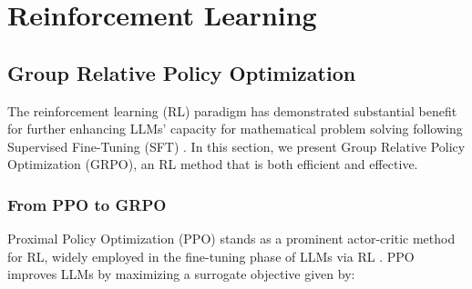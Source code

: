 \section{Reinforcement Learning}

\subsection{Group Relative Policy Optimization} The reinforcement learning (RL) paradigm has demonstrated substantial benefit for further enhancing LLMs’ capacity for mathematical problem solving following Supervised Fine-Tuning (SFT) \citep{wang2023math,wizardmath}. In this section, we present Group Relative Policy Optimization (GRPO), an RL method that is both efficient and effective.

\subsubsection{From PPO to GRPO} Proximal Policy Optimization (PPO) \citep{schulman2017proximal} stands as a prominent actor-critic method for RL, widely employed in the fine-tuning phase of LLMs via RL \citep{ouyang2022training}. PPO improves LLMs by maximizing a surrogate objective given by:

